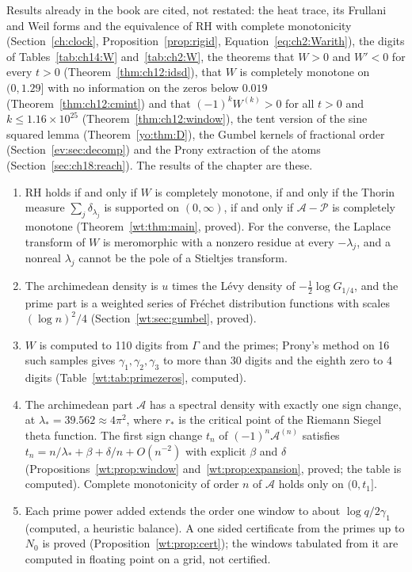 Results already in the book are cited, not restated: the heat trace, its Frullani and Weil forms and the equivalence of RH with complete monotonicity (Section~\ref{ch:clock}, Proposition~\ref{prop:rigid}, Equation~\eqref{eq:ch2:Warith}), the digits of Tables~\ref{tab:ch14:W} and~\ref{tab:ch2:W}, the theorems that $W>0$ and $W'<0$ for every $t>0$ (Theorem~\ref{thm:ch12:idsd}), that $W$ is completely monotone on $(0,1.29]$ with no information on the zeros below $0.019$ (Theorem~\ref{thm:ch12:cmint}) and that $(-1)^kW^{(k)}>0$ for all $t>0$ and $k\le1.16\times10^{25}$ (Theorem~\ref{thm:ch12:window}), the tent version of the sine squared lemma (Theorem~\ref{yo:thm:D}), the Gumbel kernels of fractional order (Section~\ref{ev:sec:decomp}) and the Prony extraction of the atoms (Section~\ref{sec:ch18:reach}). The results of the chapter are these.
\begin{enumerate}
\item RH holds if and only if $W$ is completely monotone, if and only if the Thorin measure $\sum_j\delta_{\lambda_j}$ is supported on $(0,\infty)$, if and only if $\mathcal A-\mathcal P$ is completely monotone (Theorem~\ref{wt:thm:main}, proved). For the converse, the Laplace transform of $W$ is meromorphic with a nonzero residue at every $-\lambda_j$, and a nonreal $\lambda_j$ cannot be the pole of a Stieltjes transform.
\item The archimedean density is $u$ times the L\'evy density of $-\frac12\log G_{1/4}$, and the prime part is a weighted series of Fr\'echet distribution functions with scales $(\log n)^2/4$ (Section~\ref{wt:sec:gumbel}, proved).
\item $W$ is computed to 110 digits from $\Gamma$ and the primes; Prony's method on 16 such samples gives $\gamma_1,\gamma_2,\gamma_3$ to more than 30 digits and the eighth zero to 4 digits (Table~\ref{wt:tab:primezeros}, computed).
\item The archimedean part $\mathcal A$ has a spectral density with exactly one sign change, at $\lambda_*=39.562\approx4\pi^2$, where $r_*$ is the critical point of the Riemann Siegel theta function. The first sign change $t_n$ of $(-1)^n\mathcal A^{(n)}$ satisfies $t_n=n/\lambda_*+\beta+\delta/n+O(n^{-2})$ with explicit $\beta$ and $\delta$ (Propositions~\ref{wt:prop:window} and~\ref{wt:prop:expansion}, proved; the table is computed). Complete monotonicity of order $n$ of $\mathcal A$ holds only on $(0,t_1]$.
\item Each prime power added extends the order one window to about $\log q/2\gamma_1$ (computed, a heuristic balance). A one sided certificate from the primes up to $N_0$ is proved (Proposition~\ref{wt:prop:cert}); the windows tabulated from it are computed in floating point on a grid, not certified.

\end{enumerate}
